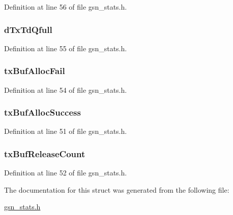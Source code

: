 Definition at line 56 of file gsn\_\-stats.h.

\hypertarget{a00092_a7d2ac350a2e3c596fbfb525a4f039285}{
\subsubsection[{dTxTdQfull}]{ {\bf dTxTdQfull}}}
\label{a00092_a7d2ac350a2e3c596fbfb525a4f039285}


Definition at line 55 of file gsn\_\-stats.h.

\hypertarget{a00092_aef1a78db1439dd9f28bf25ce00f8634e}{
\subsubsection[{txBufAllocFail}]{ {\bf txBufAllocFail}}}
\label{a00092_aef1a78db1439dd9f28bf25ce00f8634e}


Definition at line 54 of file gsn\_\-stats.h.

\hypertarget{a00092_a874a9f6cb0895f20925b1a1eb7cf2ed4}{
\subsubsection[{txBufAllocSuccess}]{ {\bf txBufAllocSuccess}}}
\label{a00092_a874a9f6cb0895f20925b1a1eb7cf2ed4}


Definition at line 51 of file gsn\_\-stats.h.

\hypertarget{a00092_a2154526c3fd63ceabf76e7a66af6756b}{
\subsubsection[{txBufReleaseCount}]{ {\bf txBufReleaseCount}}}
\label{a00092_a2154526c3fd63ceabf76e7a66af6756b}


Definition at line 52 of file gsn\_\-stats.h.



The documentation for this struct was generated from the following file:\begin{DoxyCompactItemize}
\item 
\hyperlink{a00591}{gsn\_\-stats.h}\end{DoxyCompactItemize}
